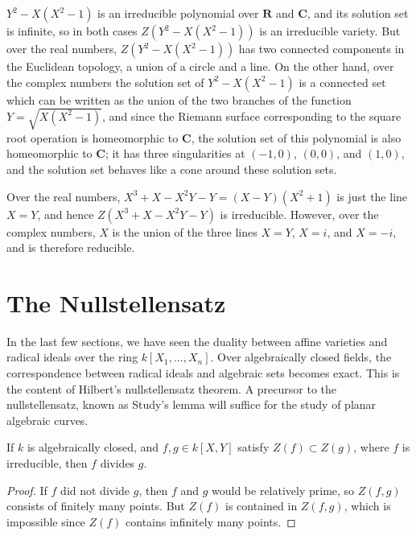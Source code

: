 \begin{example}
    $Y^2 - X(X^2 - 1)$ is an irreducible polynomial over $\mathbf{R}$ and $\mathbf{C}$, and its solution set is infinite, so in both cases $Z(Y^2 - X(X^2 - 1))$ is an irreducible variety. But over the real numbers, $Z(Y^2 - X(X^2 - 1))$ has two connected components in the Euclidean topology, a union of a circle and a line. On the other hand, over the complex numbers the solution set of $Y^2 - X(X^2 - 1)$ is a connected set which can be written as the union of the two branches of the function $Y = \sqrt{X(X^2 - 1)}$, and since the Riemann surface corresponding to the square root operation is homeomorphic to $\mathbf{C}$, the solution set of this polynomial is also homeomorphic to $\mathbf{C}$; it has three singularities at $(-1,0)$, $(0,0)$, and $(1,0)$, and the solution set behaves like a cone around these solution sets.
\end{example}

\begin{example}
    Over the real numbers, $X^3 + X - X^2Y - Y = (X-Y)(X^2 + 1)$ is just the line $X = Y$, and hence $Z(X^3 + X - X^2Y - Y)$ is irreducible. However, over the complex numbers, $X$ is the union of the three lines $X = Y$, $X = i$, and $X = -i$, and is therefore reducible.
\end{example}

\section{The Nullstellensatz}

In the last few sections, we have seen the duality between affine varieties and radical ideals over the ring $k[X_1, \dots, X_n]$. Over algebraically closed fields, the correspondence between radical ideals and algebraic sets becomes exact. This is the content of Hilbert's nullstellensatz theorem. A precursor to the nullstellensatz, known as Study's lemma will suffice for the study of planar algebraic curves.

\begin{theorem}[Study]
    If $k$ is algebraically closed, and $f,g \in k[X,Y]$ satisfy $Z(f) \subset Z(g)$, where $f$ is irreducible, then $f$ divides $g$.
\end{theorem}
\begin{proof}
    If $f$ did not divide $g$, then $f$ and $g$ would be relatively prime, so $Z(f,g)$ consists of finitely many points. But $Z(f)$ is contained in $Z(f,g)$, which is impossible since $Z(f)$ contains infinitely many points.
\end{proof}


